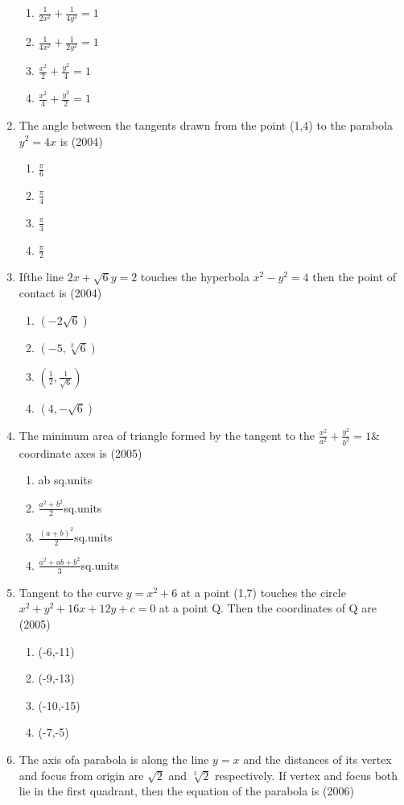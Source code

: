 \documentclass[12pt]{article}
\begin{document}
\begin{enumerate}
\begin{enumerate}
\item $\frac{1}{2x^2}+\frac{1}{4y^2}=1$
\item $\frac{1}{4x^2}+\frac{1}{2y^2}=1$
\item $\frac{x^2}{2}+\frac{y^2}{4}=1$
\item $\frac{x^2}{4}+\frac{y^2}{2}=1$
\end{enumerate}
\item The angle between the tangents drawn from the point (1,4) to the parabola $y^2=4x$ is (2004)
\begin{enumerate}
\item $\frac{\pi}{6}$
\item $\frac{\pi}{4}$
\item $\frac{\pi}{3}$
\item $\frac{\pi}{2}$
\end{enumerate}
\item Ifthe line $2x+\sqrt{6}y=2$ touches the hyperbola $x^2-y^2=4$ then the point of contact is (2004)
\begin{enumerate}
\item $(-2\sqrt{6})$
\item $(-5,\sqrt[2]{6})$
\item $(\frac{1}{2},\frac{1}{\sqrt{6}})$
\item $(4,-\sqrt{6})$
\end{enumerate}
\item The minimum area of triangle formed by the tangent to the $\frac{x^2}{a^2}+\frac{y^2}{b^2}=1 \&$ coordinate axes is (2005)
\begin{enumerate}
\item ab sq.units
\item $\frac{a^2+b^2}{2}$sq.units
\item $\frac{(a+b)^2}{2}$sq.units
\item $\frac{a^2+ab+b^2}{3}$sq.units
\end{enumerate}
\item Tangent to the curve $y=x^2+6$ at a point (1,7) touches the circle $x^2+y^2+16x+12y+c=0$ at a point Q. Then the coordinates of Q are (2005)
\begin{enumerate}
\item (-6,-11)
\item (-9,-13)
\item (-10,-15)
\item (-7,-5)
\end{enumerate}
\item The axis ofa parabola is along the line $y=x$ and the distances of its vertex and focus from origin are $\sqrt{2}$ and $\sqrt[2]{2}$ respectively. If vertex and focus both lie in the first quadrant, then the equation of the parabola is (2006)

\end{enumerate}
\end{document}
